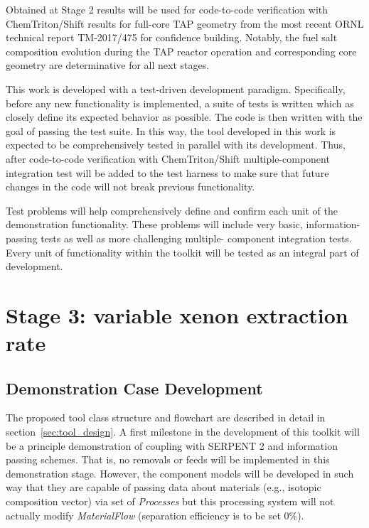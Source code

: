 Obtained at Stage 2 results will be used for code-to-code verification with  
ChemTriton/Shift results for full-core \gls{TAP} geometry from the most recent 
\gls{ORNL} technical report TM-2017/475 \cite{betzler_assessment_2017} for 
confidence building. Notably, the fuel salt composition evolution during the 
\gls{TAP} reactor operation and corresponding core geometry are determinative  
for all next stages.

This work is developed with a test-driven development paradigm. Specifically, 
before any new functionality is implemented, a suite of tests is written which 
as closely define its expected behavior as possible. The code is then written 
with the goal of passing the test suite. In this way, the tool developed in 
this work is expected to be comprehensively tested in parallel with its 
development. Thus, after code-to-code verification with ChemTriton/Shift 
multiple-component integration test will be added to the test harness to make 
sure that future changes in the code will not break previous functionality.

Test problems will help comprehensively define and confirm each unit 
of the demonstration functionality. These problems will include very 
basic, information-passing tests as well as more challenging multiple-
component integration tests. Every unit of functionality
within the toolkit will be tested as an integral part of development.

\section{Stage 3: variable xenon extraction rate}

\subsection{Demonstration Case Development}
The proposed tool class structure and flowchart are 
described in detail in section~\ref{sec:tool_design}.
A first milestone in the development of this toolkit will be a 
principle demonstration of coupling with SERPENT 2 and 
information passing schemes. That is, no removals or feeds 
will be implemented in this demonstration stage. However, 
the component models will be developed in such way that 
they are capable of passing data about materials (e.g., isotopic 
composition vector) via set of \textit{Processes} but this 
processing system will not actually modify \textit{MaterialFlow} 
(separation efficiency is to be set 0\%).

